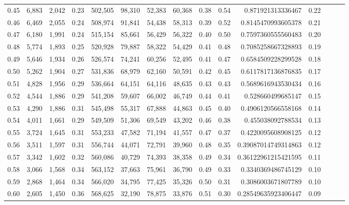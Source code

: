 \begin{tabular}{rrrrrrrrrrrrrrr}
0.45 &   6,883 &  2,042 &  0.23 &  502,505 &   98,310 &   52,383 &   60,368 &  0.38 &  0.54 &     0.871921313336467 &      0.22 \\
0.46 &   6,469 &  2,055 &  0.24 &  508,974 &   91,841 &   54,438 &   58,313 &  0.39 &  0.52 &    0.8145470993605378 &      0.21 \\
0.47 &   6,180 &  1,991 &  0.24 &  515,154 &   85,661 &   56,429 &   56,322 &  0.40 &  0.50 &    0.7597360555560483 &      0.20 \\
0.48 &   5,774 &  1,893 &  0.25 &  520,928 &   79,887 &   58,322 &   54,429 &  0.41 &  0.48 &    0.7085258667328893 &      0.19 \\
0.49 &   5,646 &  1,934 &  0.26 &  526,574 &   74,241 &   60,256 &   52,495 &  0.41 &  0.47 &    0.6584509228299528 &      0.18 \\
0.50 &   5,262 &  1,904 &  0.27 &  531,836 &   68,979 &   62,160 &   50,591 &  0.42 &  0.45 &    0.6117817136876835 &      0.17 \\
0.51 &   4,828 &  1,956 &  0.29 &  536,664 &   64,151 &   64,116 &   48,635 &  0.43 &  0.43 &    0.5689616943530434 &      0.16 \\
0.52 &   4,544 &  1,886 &  0.29 &  541,208 &   59,607 &   66,002 &   46,749 &  0.44 &  0.41 &     0.528660499685147 &      0.15 \\
0.53 &   4,290 &  1,886 &  0.31 &  545,498 &   55,317 &   67,888 &   44,863 &  0.45 &  0.40 &    0.4906120566558168 &      0.14 \\
0.54 &   4,011 &  1,661 &  0.29 &  549,509 &   51,306 &   69,549 &   43,202 &  0.46 &  0.38 &     0.455038092788534 &      0.13 \\
0.55 &   3,724 &  1,645 &  0.31 &  553,233 &   47,582 &   71,194 &   41,557 &  0.47 &  0.37 &    0.4220095608908125 &      0.12 \\
0.56 &   3,511 &  1,597 &  0.31 &  556,744 &   44,071 &   72,791 &   39,960 &  0.48 &  0.35 &   0.39087014749314863 &      0.12 \\
0.57 &   3,342 &  1,602 &  0.32 &  560,086 &   40,729 &   74,393 &   38,358 &  0.49 &  0.34 &   0.36122961215421595 &      0.11 \\
0.58 &   3,066 &  1,568 &  0.34 &  563,152 &   37,663 &   75,961 &   36,790 &  0.49 &  0.33 &    0.3340369486745129 &      0.10 \\
0.59 &   2,868 &  1,464 &  0.34 &  566,020 &   34,795 &   77,425 &   35,326 &  0.50 &  0.31 &    0.3086003671807789 &      0.10 \\
0.60 &   2,605 &  1,450 &  0.36 &  568,625 &   32,190 &   78,875 &   33,876 &  0.51 &  0.30 &   0.28549635923406447 &      0.09 \\

\end{tabular}
